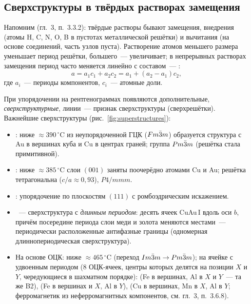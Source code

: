 \subsection{Сверхструктуры в твёрдых растворах замещения}\label{ssec:superstructures}

Напомним (гл.~3, п.~3.3.2): твёрдые растворы бывают замещения,
внедрения (атомы H, C, N, O, B в пустотах металлической решётки) и
вычитания (на основе соединений, часть узлов пуста). Растворение атомов
меньшего размера уменьшает период решётки, большего~— увеличивает; в
непрерывных растворах замещения период часто меняется линейно с
составом~— :
\begin{equation}\label{eq:vegard-cryst}
a=a_1c_1+a_2c_2=a_1+(a_2-a_1)c_2 ,
\end{equation}
где $a_i$~— периоды компонентов, $c_i$~— атомные доли.

При упорядочении на рентгенограммах появляются дополнительные,
\emph{сверхструктурные}, линии~— признак сверхструктуры (сверхрешётки).
Важнейшие сверхструктуры (рис.~\ref{fig:superstructures}):
\begin{itemize}
\item {}: ниже $\approx390\,^\circ$C из неупорядоченной ГЦК
($Fm\bar{3}m$) образуется структура с Au в вершинах куба и Cu в центрах граней;
группа $Pm\bar{3}m$ (решётка стала примитивной).
\item {}: ниже $\approx385\,^\circ$C слои $(001)$ заняты
поочерёдно атомами Cu и Au; решётка тетрагональна ($c/a\approx0{,}93$),
$P4/mmm$.
\item {}: упорядочение по плоскостям $(111)$ с
ромбоэдрическим искажением.
\item {}~— сверхструктура с \emph{длинным периодом}: десять
ячеек CuAu\,I вдоль оси $b$, причём посередине периода слои меди и золота
меняются местами~— периодически расположенные антифазные границы
(одномерная длиннопериодическая сверхструктура).
\item На основе ОЦК:  ниже $\approx465\,^\circ$C
(переход $Im\bar{3}m\to Pm\bar{3}m$); на ячейке с удвоенным периодом (8 ОЦК-ячеек,
центры которых делятся на позиции $X$ и $Y$, чередующиеся в шахматном
порядке):  (Fe в вершинах, Al в $X$ и $Y$~— та же B2),
 (Fe в вершинах и $X$, Al в $Y$),  (Cu в вершинах, Mn в $X$, Al в $Y$; ферромагнетик из
неферромагнитных компонентов, см. гл.~3, п.~3.6.8).
\end{itemize}

